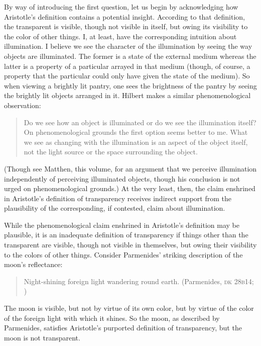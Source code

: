 \documentclass[12pt]{article}
\begin{document}
By way of introducing the first question, let us begin by acknowledging how Aristotle's definition contains a potential insight. According to that definition, the transparent is visible, though not visible in itself, but owing its visibility to the color of other things. I, at least, have the corresponding intuition about illumination. I believe we see the character of the illumination by seeing the way objects are illuminated. The former is a state of the external medium whereas the latter is a property of a particular arrayed in that medium (though, of course, a property that the particular could only have given the state of the medium). So when viewing a brightly lit pantry, one sees the brightness of the pantry by seeing the brightly lit objects arranged in it. Hilbert makes a similar phenomenological observation:
\begin{quote}
	Do we see how an object is illuminated or do we see the illumination itself? On phenomenological grounds the first option seems better to me. What we see as changing with the illumination is an aspect of the object itself, not the light source or the space surrounding the object. \citep[150--151]{Hilbert:2007qy}
\end{quote} 
(Though see Matthen, this volume, for an argument that we perceive illumination independently of perceiving illuminated objects, though his conclusion is not urged on phenomenological grounds.) At the very least, then, the claim enshrined in Aristotle's definition of transparency receives indirect support from the plausibility of the corresponding, if contested, claim about illumination.

While the phenomenological claim enshrined in Aristotle's definition may be plausible, it is an inadequate definition of transparency if things other than the transparent are visible, though not visible in themselves, but owing their visibility to the colors of other things. Consider Parmenides' striking description of the moon's reflectance:
\begin{quote}
	Night-shining foreign light wandering round earth. (Parmenides, \textsc{dk} 28\textsc{b}14; \citealt[156]{McKirahan:1994ve})
\end{quote}
The moon is visible, but not by virtue of its own color, but by virtue of the color of the foreign light with which it shines. So the moon, as described by Parmenides, satisfies Aristotle's purported definition of transparency, but the moon is not transparent. 
\end{document}

